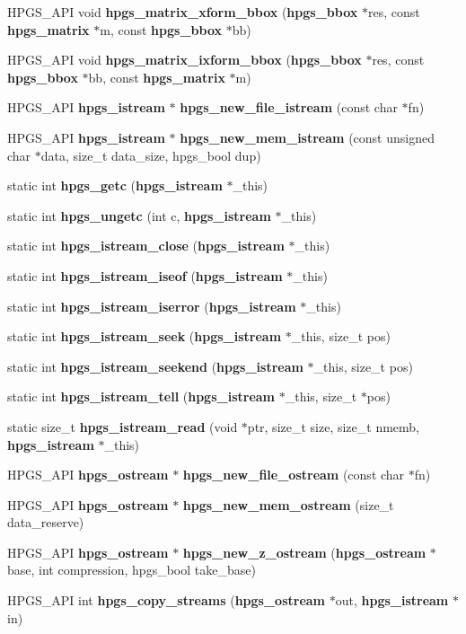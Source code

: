 \begin{CompactItemize}
\item 
HPGS\_\-API void {\bf hpgs\_\-matrix\_\-xform\_\-bbox} ({\bf hpgs\_\-bbox} $\ast$res, const {\bf hpgs\_\-matrix} $\ast$m, const {\bf hpgs\_\-bbox} $\ast$bb)
\item 
HPGS\_\-API void {\bf hpgs\_\-matrix\_\-ixform\_\-bbox} ({\bf hpgs\_\-bbox} $\ast$res, const {\bf hpgs\_\-bbox} $\ast$bb, const {\bf hpgs\_\-matrix} $\ast$m)
\item 
HPGS\_\-API {\bf hpgs\_\-istream} $\ast$ {\bf hpgs\_\-new\_\-file\_\-istream} (const char $\ast$fn)
\item 
HPGS\_\-API {\bf hpgs\_\-istream} $\ast$ {\bf hpgs\_\-new\_\-mem\_\-istream} (const unsigned char $\ast$data, size\_\-t data\_\-size, hpgs\_\-bool dup)
\item 
static int {\bf hpgs\_\-getc} ({\bf hpgs\_\-istream} $\ast$\_\-this)
\item 
static int {\bf hpgs\_\-ungetc} (int c, {\bf hpgs\_\-istream} $\ast$\_\-this)
\item 
static int {\bf hpgs\_\-istream\_\-close} ({\bf hpgs\_\-istream} $\ast$\_\-this)
\item 
static int {\bf hpgs\_\-istream\_\-iseof} ({\bf hpgs\_\-istream} $\ast$\_\-this)
\item 
static int {\bf hpgs\_\-istream\_\-iserror} ({\bf hpgs\_\-istream} $\ast$\_\-this)
\item 
static int {\bf hpgs\_\-istream\_\-seek} ({\bf hpgs\_\-istream} $\ast$\_\-this, size\_\-t pos)
\item 
static int {\bf hpgs\_\-istream\_\-seekend} ({\bf hpgs\_\-istream} $\ast$\_\-this, size\_\-t pos)
\item 
static int {\bf hpgs\_\-istream\_\-tell} ({\bf hpgs\_\-istream} $\ast$\_\-this, size\_\-t $\ast$pos)
\item 
static size\_\-t {\bf hpgs\_\-istream\_\-read} (void $\ast$ptr, size\_\-t size, size\_\-t nmemb, {\bf hpgs\_\-istream} $\ast$\_\-this)
\item 
HPGS\_\-API {\bf hpgs\_\-ostream} $\ast$ {\bf hpgs\_\-new\_\-file\_\-ostream} (const char $\ast$fn)
\item 
HPGS\_\-API {\bf hpgs\_\-ostream} $\ast$ {\bf hpgs\_\-new\_\-mem\_\-ostream} (size\_\-t data\_\-reserve)
\item 
HPGS\_\-API {\bf hpgs\_\-ostream} $\ast$ {\bf hpgs\_\-new\_\-z\_\-ostream} ({\bf hpgs\_\-ostream} $\ast$base, int compression, hpgs\_\-bool take\_\-base)
\item 
HPGS\_\-API int \textbf{hpgs\_\-copy\_\-streams} ({\bf hpgs\_\-ostream} $\ast$out, {\bf hpgs\_\-istream} $\ast$in)\label{group__base_g74770e20d2f627732e67d5e60750ab15}


\end{CompactItemize}

